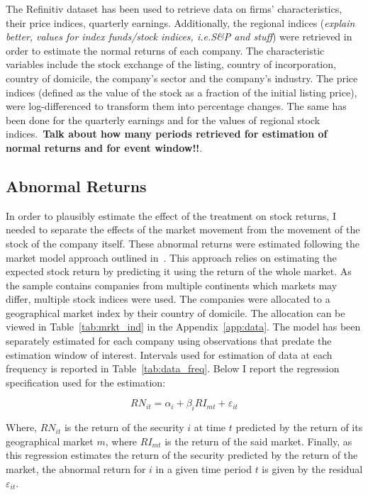 \documentclass[12pt]{article}
\begin{document}
The Refinitiv dataset has been used to retrieve data on firms' characteristics, their price indices, quarterly earnings. Additionally, the regional indices (\textit{explain better, values for index funds/stock indices, i.e.\@ S\&P and stuff}) were retrieved in order to estimate the normal returns of each company. The characteristic variables include the stock exchange of the listing, country of incorporation, country of domicile, the company's sector and the company's industry. The price indices (defined as the value of the stock as a fraction of the initial listing price), were log-differenced to transform them into percentage changes. The same has been done for the quarterly earnings and for the values of regional stock indices.\ \textbf{Talk about how many periods retrieved for estimation of normal returns and for event window!!}.

\subsection{Abnormal Returns}

In order to plausibly estimate the effect of the treatment on stock returns, I needed to separate the effects of the market movement from the movement of the stock of the company itself. These abnormal returns were estimated following the market model approach outlined in\ \cite{mackinlayEventStudiesEconomics1997}. This approach relies on estimating the expected stock return by predicting it using the return of the whole market. As the sample contains companies from multiple continents which markets may differ, multiple stock indices were used. The companies were allocated to a geographical market index by their country of domicile. The allocation can be viewed in Table~\ref{tab:mrkt_ind} in the Appendix~\ref{app:data}. The model has been separately estimated for each company using observations that predate the estimation window of interest. Intervals used for estimation of data at each frequency is reported in Table~\ref{tab:data_freq}. Below I report the regression specification used for the estimation:

\begin{equation}\label{eq:reg_market_model}
    RN_{it} = \alpha_i + \beta_{i} RI_{mt} + \varepsilon_{it}
\end{equation}

Where, $RN_{it}$ is the return of the security $i$ at time $t$ predicted by the return of its geographical market $m$, where $RI_{mt}$ is the return of the said market. Finally, as this regression estimates the return of the security predicted by the return of the market, the abnormal return for $i$ in a given time period $t$ is given by the residual $\varepsilon_{it}$.
\end{document}
